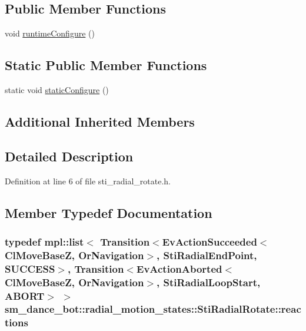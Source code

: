 \subsection*{Public Member Functions}
\begin{DoxyCompactItemize}
\item 
void \hyperlink{structsm__dance__bot_1_1radial__motion__states_1_1StiRadialRotate_a18e1871865f5385c03068eb7a1ec34a0}{runtime\+Configure} ()
\end{DoxyCompactItemize}
\subsection*{Static Public Member Functions}
\begin{DoxyCompactItemize}
\item 
static void \hyperlink{structsm__dance__bot_1_1radial__motion__states_1_1StiRadialRotate_a93092bf04595fb025e3a0d154acb037b}{static\+Configure} ()
\end{DoxyCompactItemize}
\subsection*{Additional Inherited Members}


\subsection{Detailed Description}


Definition at line 6 of file sti\+\_\+radial\+\_\+rotate.\+h.



\subsection{Member Typedef Documentation}
\subsubsection[{\texorpdfstring{reactions}{reactions}}]{\setlength{\rightskip}{0pt plus 5cm}typedef mpl\+::list$<$ Transition$<$Ev\+Action\+Succeeded$<${\bf Cl\+Move\+BaseZ}, {\bf Or\+Navigation}$>$, {\bf Sti\+Radial\+End\+Point}, {\bf S\+U\+C\+C\+E\+SS}$>$, Transition$<$Ev\+Action\+Aborted$<${\bf Cl\+Move\+BaseZ}, {\bf Or\+Navigation}$>$, {\bf Sti\+Radial\+Loop\+Start}, A\+B\+O\+RT$>$ $>$ {\bf sm\+\_\+dance\+\_\+bot\+::radial\+\_\+motion\+\_\+states\+::\+Sti\+Radial\+Rotate\+::reactions}}\hypertarget{structsm__dance__bot_1_1radial__motion__states_1_1StiRadialRotate_a9a1ffbc6c684c386ecad126451aa45f8}{}\label{structsm__dance__bot_1_1radial__motion__states_1_1StiRadialRotate_a9a1ffbc6c684c386ecad126451aa45f8}


